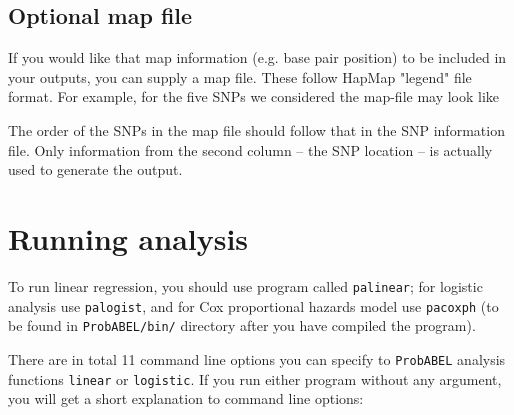 \documentclass[12pt]{article}
\begin{document}
\subsection{Optional map file}
If you would like that map information (e.g. base pair position) to 
be included in your outputs, you can supply a map file. These follow 
HapMap "legend" file format. For example, for the five SNPs we considered 
the map-file may look like



The order of the SNPs in the map file should follow that in the SNP information 
file. Only information from the second column -- the SNP location -- is 
actually used to generate the output.

\section{Running analysis}

To run linear regression, you should use program called \texttt{palinear};
for logistic analysis use \texttt{palogist}, and for Cox proportional 
hazards model use \texttt{pacoxph} (to be found in 
\texttt{ProbABEL/bin/} directory after you have compiled the program).

There are in total 11 command line options you can specify to \texttt{ProbABEL} 
analysis functions \texttt{linear} or \texttt{logistic}. If you run 
either program without any argument, you 
will get a short explanation to command line options:
\end{document}
